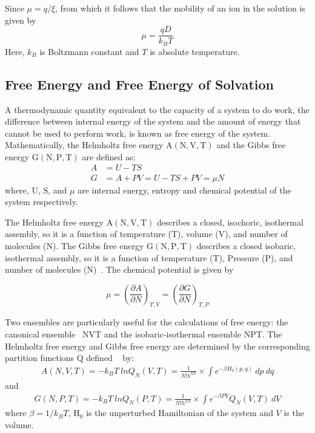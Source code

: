   Since $\mu =q/\xi$, from which it follows that the mobility of an ion in the solution is~ \citep{atkins2006, Kittel2005} given by  
   \begin{equation}
   \mu =\frac{q D}{k_BT}
   \label{mobility}
   \end{equation}
    Here, $k_B$ is Boltzmann constant and $T$ is absolute temperature.
    
   \subsection{Free Energy and Free Energy of Solvation}
  A thermodynamic quantity equivalent to the capacity of a system to do work, the difference between internal energy of the system and the amount of energy that cannot be used to perform work, is  known as free energy of the system. Mathematically, the Helmholtz free energy $\mathrm{A (N, V, T)}$  and the Gibbs free energy $\mathrm{G (N, P, T)}$ are defined as:  
   \begin{align}
    A &= U - T S\\
    G &= A + PV = U -TS + PV = \mu N
    \end{align}
    where, $\mathrm{U}$, $\mathrm{S}$, and $\mu$ are internal energy,  entropy and chemical potential of the system respectively. 
     
     The Helmholtz free energy $\mathrm{A(N,V, T)}$ describes a closed, isochoric, isothermal assembly, so it is a function of temperature (T), volume (V), and number of molecules (N). The Gibbs free energy $\mathrm{G(N,P, T)}$ describes a closed isobaric, isothermal assembly, so it is a function of temperature (T), Pressure (P), and number of molecules (N)~\citep{huang2009, pathria1996}. The chemical potential is given by 
    
    \begin{equation}
    \mu  = \left( \frac{\partial A}{\partial N}\right) _{T,V}= \left( \frac{\partial G}{\partial N}\right) _{T,P}
    \end{equation}
    
    Two ensembles are particularly useful for the calculations of free energy: the canonical ensemble ~NVT and the isobaric-isothermal ensemble NPT. The Helmholtz free energy  and Gibbs free energy are  determined by the corresponding partition functions $\mathrm{Q}$  defined ~ \citep{huang2009, pathria1996} by:
    \begin{eqnarray}
     A (N, V, T) = -k_B T~ ln Q_N(V,T)  =\frac{1}{N!h^{3N}}  \times  \int e^{-\beta H_0(p,q)}~ dp ~ dq
     \end{eqnarray}
     and
     \begin{eqnarray}
     G (N, P, T) = -k_B T~ ln Q_N(P,T)  =\frac{1}{N!h^{3N}} \times    \int e^{-\beta PV} Q_N(V,T) ~dV
     \end{eqnarray}
     where $\beta = 1/k_BT$, $\mathrm{H_0}$  is the unperturbed Hamiltonian of the system and $V$ is the volume.
     
